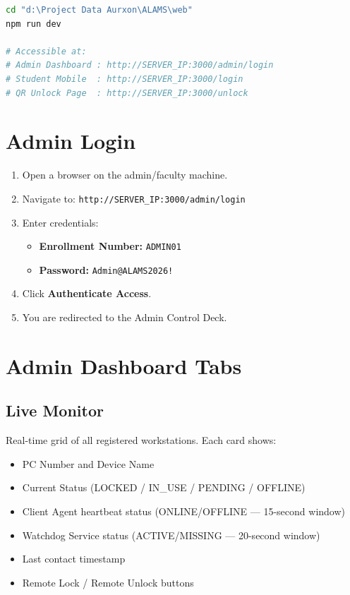 \begin{tcolorbox}[codebox, title={Start the Next.js Web Application}]
\begin{lstlisting}[language=bash]
cd "d:\Project Data Aurxon\ALAMS\web"
npm run dev

# Accessible at:
# Admin Dashboard : http://SERVER_IP:3000/admin/login
# Student Mobile  : http://SERVER_IP:3000/login
# QR Unlock Page  : http://SERVER_IP:3000/unlock
\end{lstlisting}
\end{tcolorbox}

\section{Admin Login}

\begin{enumerate}[leftmargin=*, label=\textbf{\arabic*.}]
  \item Open a browser on the admin/faculty machine.
  \item Navigate to: \texttt{http://SERVER\_IP:3000/admin/login}
  \item Enter credentials:
    \begin{itemize}
      \item \textbf{Enrollment Number:} \texttt{ADMIN01}
      \item \textbf{Password:} \texttt{Admin@ALAMS2026!}
    \end{itemize}
  \item Click \textbf{Authenticate Access}.
  \item You are redirected to the Admin Control Deck.
\end{enumerate}

\section{Admin Dashboard Tabs}

\subsection{Live Monitor}
Real-time grid of all registered workstations. Each card shows:
\begin{itemize}[label={\textcolor{aurxonblue}{\faCircle[regular]}}]
  \item PC Number and Device Name
  \item Current Status (LOCKED / IN\_USE / PENDING / OFFLINE)
  \item Client Agent heartbeat status (ONLINE/OFFLINE — 15-second window)
  \item Watchdog Service status (ACTIVE/MISSING — 20-second window)
  \item Last contact timestamp
  \item Remote Lock / Remote Unlock buttons
\end{itemize}

